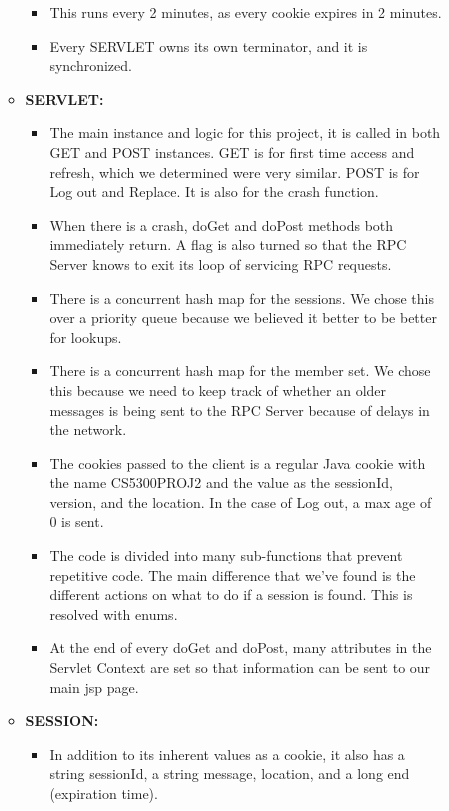 \documentclass{article}
\begin{document}
\begin{description}
\begin{itemize}
\begin{itemize}
\begin{itemize}
                \item This runs every 2 minutes, as every cookie expires in 2 minutes. 
                \item Every SERVLET owns its own terminator, and it is synchronized.
              \end{itemize}
            \item \textbf{SERVLET:}
              \begin{itemize}
                \item The main instance and logic for this project, it is called in both GET and POST instances. GET is for first time access and refresh, which we determined were very similar. POST is for Log out and Replace. It is also for the crash function.
		\item When there is a crash, doGet and doPost methods both immediately return. A flag is also turned so that the RPC Server knows to exit its loop of servicing RPC requests.
                \item There is a concurrent hash map for the sessions. We chose this over a priority queue because we believed it better to be better for lookups. 
		\item There is a concurrent hash map for the member set. We chose this because we need to keep track of whether an older messages is being sent to the RPC Server because of delays in the network.
                \item The cookies passed to the client is a regular Java cookie with the name  CS5300PROJ2 and the value as the sessionId, version, and the location. In the case of Log out, a max age of 0 is sent.
                \item The code is divided into many sub-functions that prevent repetitive code. The main difference that we've found is the different actions on what to do if a session is found. This is resolved with enums. 
		\item At the end of every doGet and doPost, many attributes in the Servlet Context are set so that information can be sent to our main jsp page.
              \end{itemize}
            \item \textbf{SESSION:}
              \begin{itemize}
                 \item   In addition to its inherent values as a cookie, it also has a string sessionId, a string message, location, and a long end (expiration time). 
              \end{itemize}

\end{itemize}
\end{itemize}
\end{description}
\end{document}
